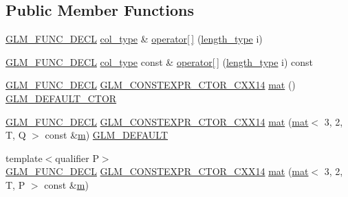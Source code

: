 \subsection*{Public Member Functions}
\begin{DoxyCompactItemize}
\item 
\mbox{\hyperlink{setup_8hpp_ab2d052de21a70539923e9bcbf6e83a51}{G\+L\+M\+\_\+\+F\+U\+N\+C\+\_\+\+D\+E\+CL}} \mbox{\hyperlink{structglm_1_1mat_3_013_00_012_00_01_t_00_01_q_01_4_aa610dcaaae528e1eea8bdaaa435ad3a4}{col\+\_\+type}} \& \mbox{\hyperlink{structglm_1_1mat_3_013_00_012_00_01_t_00_01_q_01_4_ab749a8bb52d92b278cdfdd6de7201b03}{operator\mbox{[}$\,$\mbox{]}}} (\mbox{\hyperlink{structglm_1_1mat_3_013_00_012_00_01_t_00_01_q_01_4_ac2f268fa5e899b2a6ad8139183ed61d4}{length\+\_\+type}} i)
\item 
\mbox{\hyperlink{setup_8hpp_ab2d052de21a70539923e9bcbf6e83a51}{G\+L\+M\+\_\+\+F\+U\+N\+C\+\_\+\+D\+E\+CL}} \mbox{\hyperlink{structglm_1_1mat_3_013_00_012_00_01_t_00_01_q_01_4_aa610dcaaae528e1eea8bdaaa435ad3a4}{col\+\_\+type}} const  \& \mbox{\hyperlink{structglm_1_1mat_3_013_00_012_00_01_t_00_01_q_01_4_a73a97c49ef108592edf14b0ac70f8264}{operator\mbox{[}$\,$\mbox{]}}} (\mbox{\hyperlink{structglm_1_1mat_3_013_00_012_00_01_t_00_01_q_01_4_ac2f268fa5e899b2a6ad8139183ed61d4}{length\+\_\+type}} i) const
\item 
\mbox{\hyperlink{setup_8hpp_ab2d052de21a70539923e9bcbf6e83a51}{G\+L\+M\+\_\+\+F\+U\+N\+C\+\_\+\+D\+E\+CL}} \mbox{\hyperlink{setup_8hpp_a0900f9145e68bf6061b6f5e7be3fa751}{G\+L\+M\+\_\+\+C\+O\+N\+S\+T\+E\+X\+P\+R\+\_\+\+C\+T\+O\+R\+\_\+\+C\+X\+X14}} \mbox{\hyperlink{structglm_1_1mat_3_013_00_012_00_01_t_00_01_q_01_4_a20c83ce0aec4f293bfb3923b465fe495}{mat}} () \mbox{\hyperlink{setup_8hpp_afb97a4e995bc004c0cbbfa22125b80ba}{G\+L\+M\+\_\+\+D\+E\+F\+A\+U\+L\+T\+\_\+\+C\+T\+OR}}
\item 
\mbox{\hyperlink{setup_8hpp_ab2d052de21a70539923e9bcbf6e83a51}{G\+L\+M\+\_\+\+F\+U\+N\+C\+\_\+\+D\+E\+CL}} \mbox{\hyperlink{setup_8hpp_a0900f9145e68bf6061b6f5e7be3fa751}{G\+L\+M\+\_\+\+C\+O\+N\+S\+T\+E\+X\+P\+R\+\_\+\+C\+T\+O\+R\+\_\+\+C\+X\+X14}} \mbox{\hyperlink{structglm_1_1mat_3_013_00_012_00_01_t_00_01_q_01_4_aae7ec73b0747140723ff9678e024ad52}{mat}} (\mbox{\hyperlink{structglm_1_1mat}{mat}}$<$ 3, 2, T, Q $>$ const \&\mbox{\hyperlink{_s_d_l__opengl__glext_8h_af593500c283bf1a787a6f947f503a5c2}{m}}) \mbox{\hyperlink{setup_8hpp_aefce7051c376a64ba89fa93a9f63bc2c}{G\+L\+M\+\_\+\+D\+E\+F\+A\+U\+LT}}
\item 
{\footnotesize template$<$qualifier P$>$ }\\\mbox{\hyperlink{setup_8hpp_ab2d052de21a70539923e9bcbf6e83a51}{G\+L\+M\+\_\+\+F\+U\+N\+C\+\_\+\+D\+E\+CL}} \mbox{\hyperlink{setup_8hpp_a0900f9145e68bf6061b6f5e7be3fa751}{G\+L\+M\+\_\+\+C\+O\+N\+S\+T\+E\+X\+P\+R\+\_\+\+C\+T\+O\+R\+\_\+\+C\+X\+X14}} \mbox{\hyperlink{structglm_1_1mat_3_013_00_012_00_01_t_00_01_q_01_4_a8caa3e3cecef45b321fa2583052b643c}{mat}} (\mbox{\hyperlink{structglm_1_1mat}{mat}}$<$ 3, 2, T, P $>$ const \&\mbox{\hyperlink{_s_d_l__opengl__glext_8h_af593500c283bf1a787a6f947f503a5c2}{m}})

\end{DoxyCompactItemize}
